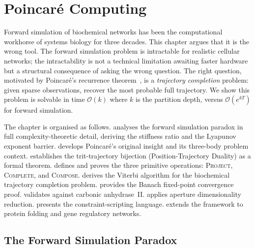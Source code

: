 ﻿%

\chapter{Poincaré Computing}
\label{ch:poincare}
\label{ch:poincare-computing}

Forward simulation of biochemical networks has been the computational workhorse
of systems biology for three decades.  This chapter argues that it is the wrong
tool.  The forward simulation problem is intractable for realistic cellular
networks; the intractability is not a technical limitation awaiting faster
hardware but a structural consequence of asking the wrong question.  The right
question, motivated by Poincaré's recurrence
theorem~\citep{Poincare1892,poincare1890probleme}, is a \emph{trajectory
completion} problem: given sparse observations, recover the most probable full
trajectory.  We show this problem is solvable in time $\mathcal{O}(k)$ where
$k$ is the partition depth, versus $\mathcal{O}(e^{kT})$ for forward simulation.

The chapter is organised as follows.   analyses the
forward simulation paradox in full complexity-theoretic detail, deriving the
stiffness ratio and the Lyapunov exponent barrier.  
develops Poincaré's original insight and its three-body problem context.
 establishes the trit-trajectory bijection (Position-Trajectory
Duality) as a formal theorem.   defines and proves
the three primitive operations: \textsc{Project}, \textsc{Complete}, and
\textsc{Compose}.   derives the Viterbi algorithm for the
biochemical trajectory completion problem.   provides the
Banach fixed-point convergence proof.   validates
against carbonic anhydrase~II.   applies aperture
dimensionality reduction.   presents the constraint-scripting
language.   extends the framework to protein folding and
gene regulatory networks.

\section{The Forward Simulation Paradox}
\label{sec:forward-paradox}

